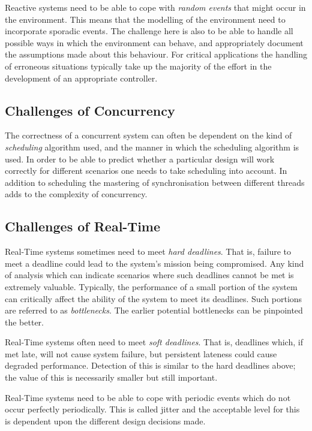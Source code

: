 \documentclass{overturerepchap}
\begin{document}
Reactive systems need to be able to cope with \emph{random events} that might
occur in the environment. This means that the modelling of the
environment need to incorporate sporadic events. The challenge here is
also to be able to handle all possible ways in which the environment
can behave, and appropriately document the assumptions made about this 
behaviour. For critical applications the handling of erroneous
situations typically take up the majority of the effort in the
development of an appropriate controller.

\subsection{Challenges of Concurrency}

The correctness of a concurrent system can often be dependent on the
kind of \emph{scheduling} algorithm used, and the manner in which the
scheduling algorithm is used. In order to be able to predict whether a
particular design will work correctly for different scenarios one
needs to take scheduling into account. In addition to scheduling the 
mastering of synchronisation between different threads adds to the
complexity of concurrency.

\subsection{Challenges of Real-Time}

Real-Time systems sometimes need to meet \emph{hard deadlines}. That
is, failure to meet a deadline could lead to the system's mission
being compromised. Any kind of analysis which can indicate scenarios
where such deadlines cannot be met is extremely valuable.  Typically,
the performance of a small portion of the system can critically affect
the ability of the system to meet its deadlines. Such portions are
referred to as \emph{bottlenecks}.  The earlier potential bottlenecks
can be pinpointed the better.

Real-Time systems often need to meet \emph{soft deadlines}. That is,
deadlines which, if met late, will not cause system failure, but
persistent lateness could cause degraded performance. Detection of
this is similar to the hard deadlines above; the value of this is
necessarily smaller but still important.

Real-Time systems need to be able to cope with periodic events which
do not occur perfectly periodically. This is called jitter and the
acceptable level for this is dependent upon the different design
decisions made.
\end{document}

